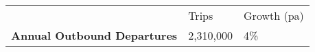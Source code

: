 \begin{tabular}[t]{p{4.7cm}>{\hfill}p{1.1cm}>{\hfill}p{1.7cm}}
   & Trips & Growth (pa) \\ 
 \textbf{Annual Outbound Departures} & 2,310,000 & 4\% \\ 
  \end{tabular}

